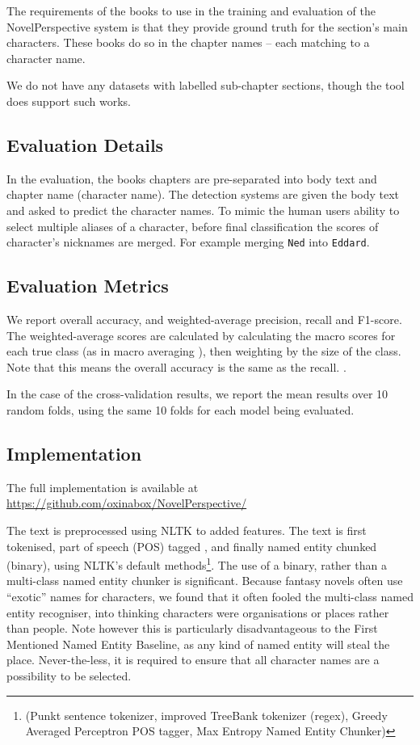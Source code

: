 \documentclass[11pt,a4paper]{article}
\newcommand{\parencite}{\citep}
\begin{document}
The requirements of the books to use in the training and evaluation of the NovelPerspective system is that they provide ground truth for the section's main characters.
These books do so in the chapter names -- each matching to a character name.

We do not have any datasets with labelled sub-chapter sections,
though the tool does support such works.

\subsection{Evaluation Details}
In the evaluation, the books chapters are pre-separated into body text and chapter name (character name).
The detection systems are given the body text and asked to predict the character names.
To mimic the human users ability to select multiple aliases of a character, before final classification the scores of character's nicknames are merged.
For example merging \texttt{Ned} into \texttt{Eddard}.

\subsection{Evaluation Metrics}
We report overall accuracy, and weighted-average precision, recall and F1-score.
The weighted-average scores are calculated by calculating the macro scores for each true class (as in macro averaging \parencite{SOKOLOVA2009427}), then weighting by the size of the class.
Note that this means the overall accuracy is the same as the recall.
.

In the case of the cross-validation results, we report the mean results over 10 random folds, using the same 10 folds for each model being evaluated.

\subsection{Implementation}
The full implementation is available at \url{https://github.com/oxinabox/NovelPerspective/}

The text is preprocessed using NLTK \parencite{bird2009natural} to added features.
The text is first tokenised, part of speech (POS) tagged , and finally named entity chunked (binary), using NLTK's default methods\footnote{(Punkt sentence tokenizer, improved TreeBank tokenizer (regex), Greedy Averaged Perceptron POS tagger, Max Entropy Named Entity Chunker)}.
The use of a binary, rather than a multi-class named entity chunker is significant.
Because fantasy novels often use ``exotic'' names for characters, we found that it often  fooled the multi-class named entity recogniser, into thinking characters were organisations or places rather than people.
Note however this is particularly disadvantageous to the First Mentioned Named Entity Baseline, as any kind of named entity will steal the place.
Never-the-less, it is required to ensure that all character names are a possibility to be selected.
\end{document}
